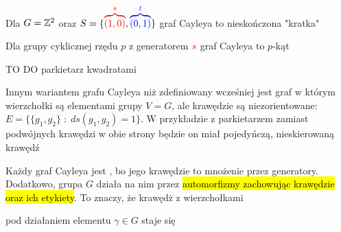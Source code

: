\begin{example}[m]
\item Dla $G=\mathbb{Z}^2$ oraz $S=\{{\color{red}\overbrace{(1, 0)}^s}, {\color{blue}\overbrace{(0, 1)}^t}\}$ graf Cayleya to nieskończona "kratka"
  \bigskip

  \begin{center}
  \end{center}
\item Dla grupy cyklicznej rzędu $p$ z generatorem $\color{red}s$ graf Cayleya to $p$-kąt
  \begin{center}
  \end{center}
\item {\color{red}\Large TO DO} parkietarz kwadratami
\end{example}

Innym wariantem grafu Cayleya niż zdefiniowany wcześniej jest graf w którym wierzchołki są elementami grupy $V=G$, ale krawędzie są niezorientowane: $E=\{\{g_1, g_2\}\;:\;ds(g_1,g_2)=1\}$. W przykładzie z parkietarzem zamiast podwójnych krawędzi w obie strony będzie on miał pojedyńczą, nieskierowaną krawędź

Każdy graf Cayleya jest , bo jego krawędzie to mnożenie przez generatory. Dodatkowo, grupa $G$ działa na nim przez \hl{automorfizmy zachowując krawędzie oraz ich etykiety}. To znaczy, że krawędż z wierzchołkami 
\begin{center}\end{center} 
pod działaniem elementu $\gamma \in G$ staje się 
\begin{center}\end{center}

